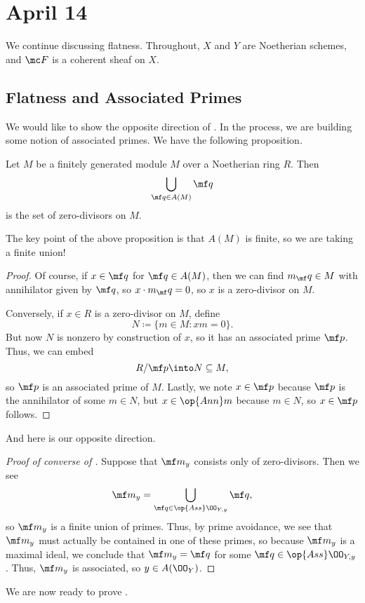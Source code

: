 \documentclass[../notes.tex]{subfiles}
\begin{document}
\section{April 14}

We continue discussing flatness. Throughout, $X$ and $Y$ are Noetherian schemes, and $\mc F$ is a coherent sheaf on $X$.

\subsection{Flatness and Associated Primes}
We would like to show the opposite direction of . In the process, we are building some notion of associated primes. We have the following proposition.
\begin{proposition}
	Let $M$ be a finitely generated module $M$ over a Noetherian ring $R$. Then
	\[\bigcup_{\mf q\in A(M)}\mf q\]
	is the set of zero-divisors on $M$.
\end{proposition}
The key point of the above proposition is that $A(M)$ is finite, so we are taking a finite union!
\begin{proof}
	Of course, if $x\in\mf q$ for $\mf q\in A(M)$, then we can find $m_\mf q\in M$ with annihilator given by $\mf q$, so $x\cdot m_\mf q=0$, so $x$ is a zero-divisor on $M$.

	Conversely, if $x\in R$ is a zero-divisor on $M$, define
	\[N\coloneqq\{m\in M:xm=0\}.\]
	But now $N$ is nonzero by construction of $x$, so it has an associated prime $\mf p$. Thus, we can embed
	\[R/\mf p\into N\subseteq M,\]
	so $\mf p$ is an associated prime of $M$. Lastly, we note $x\in\mf p$ because $\mf p$ is the annihilator of some $m\in N$, but $x\in\op{Ann}m$ because $m\in N$, so $x\in\mf p$ follows.
\end{proof}
And here is our opposite direction.
\begin{proof}[Proof of converse of ]
	Suppose that $\mf m_y$ consists only of zero-divisors. Then we see
	\[\mf m_y=\bigcup_{\mf q\in\op{Ass}\OO_{Y,y}}\mf q,\]
	so $\mf m_y$ is a finite union of primes. Thus, by prime avoidance, we see that $\mf m_y$ must actually be contained in one of these primes, so because $\mf m_y$ is a maximal ideal, we conclude that $\mf m_y=\mf q$ for some $\mf q\in\op{Ass}\OO_{Y,y}$. Thus, $\mf m_y$ is associated, so $y\in A(\OO_Y)$.
\end{proof}
We are now ready to prove .
\associatedforflatness*
\end{document}
